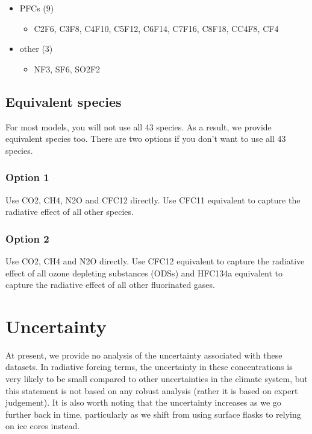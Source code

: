 \documentclass[letterpaper,10pt,english]{jupyterBook}
\begin{document}
\begin{itemize}
\begin{itemize}
\begin{itemize}
\end{itemize}

\item {}
\sphinxAtStartPar
PFCs (9)
\begin{itemize}
\item {}
\sphinxAtStartPar
C2F6, C3F8,
C4F10, C5F12,
C6F14, C7F16,
C8F18, CC4F8,
CF4

\end{itemize}

\item {}
\sphinxAtStartPar
other (3)
\begin{itemize}
\item {}
\sphinxAtStartPar
NF3, SF6, SO2F2

\end{itemize}

\end{itemize}

\end{itemize}


\subsection{Equivalent species}
\label{\detokenize{user-guide-historical:equivalent-species}}
\sphinxAtStartPar
For most models, you will not use all 43 species.
As a result, we provide equivalent species too.
There are two options if you don’t want to use all 43 species.


\subsubsection{Option 1}
\label{\detokenize{user-guide-historical:option-1}}
\sphinxAtStartPar
Use CO2, CH4, N2O and CFC\sphinxhyphen{}12 directly.
Use CFC\sphinxhyphen{}11 equivalent to capture the radiative effect of all other species.


\subsubsection{Option 2}
\label{\detokenize{user-guide-historical:option-2}}
\sphinxAtStartPar
Use CO2, CH4 and N2O directly.
Use CFC\sphinxhyphen{}12 equivalent
to capture the radiative effect of all ozone depleting substances (ODSs)
and HFC\sphinxhyphen{}134a equivalent
to capture the radiative effect of all other fluorinated gases.


\section{Uncertainty}
\label{\detokenize{user-guide-historical:uncertainty}}
\sphinxAtStartPar
At present, we provide no analysis of the uncertainty associated with these datasets.
In radiative forcing terms, the uncertainty in these concentrations
is very likely to be small compared to other uncertainties in the climate system,
but this statement is not based on any robust analysis
(rather it is based on expert judgement).
It is also worth noting that the uncertainty increases as we go further back in time,
particularly as we shift from using surface flasks to relying on ice cores instead.
\end{document}
